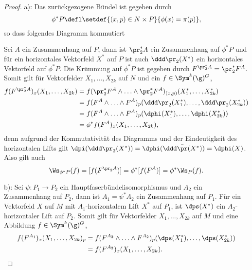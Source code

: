 \documentclass[%
	paper=a5,%
	fleqn,%
	DIV=18,%
	BCOR=0mm,
	fontsize=11pt,
	titlepage=false,%
	bibliography=totoc,
	DIV=18,%
	twoside=true,
	pdftitle=Riemannsche Geometrie,
	pdfauthor=Uwe Semmelmann,
	numbers=noendperiod]%
	{scrbook}
\begin{document}
\begin{proof}
a): 
Das zurückgezogene Bündel ist gegeben durch
\begin{align*}
\phi^*P \defl \setdef{(x,p)\in N\times P}{\phi(x) = \pi(p)},
\end{align*}
so dass folgendes Diagramm kommutiert

{

\centering


}

Sei $A$ ein Zusammenhang auf $P$, dann ist $\pr_2^*A$ ein
Zusammenhang auf $\phi^*P$ und für ein horizontales Vektorfeld $X^*$ auf $P$
ist auch $\ddd \pr_2(X^*)$ ein horizontales Vektorfeld auf $\phi^*P$. Die
Krümmung auf $\phi^*P$ ist gegeben durch $F^{\pr_2^* A} = \pr_2^*
F^A$. Somit gilt für Vektorfelder $X_1,\ldots,X_{2k}$ auf $N$ und ein
$f\in \Sym^k(\g)^G$,
\begin{align*}
f(F^{\pr_2^*A})_x(X_1,\ldots,X_{2k})
&= 
f(\pr_2^* F^A \wedge \ldots\wedge \pr_2^* F^A)_{(x,p)}(X_1^*,\ldots,X_{2k}^*)\\
&= 
f(F^A \wedge \ldots\wedge
F^A)_{p}(\ddd\pr_2(X_1^*),\ldots,\ddd\pr_2(X_{2k}^*)) \\
&= f(F^A \wedge
\ldots\wedge F^A)_{p}(\dphi(X_1^*),\ldots,\dphi(X_{2k}^*)) \\
&= \phi^*
f(F^A)_x(X_1,\ldots,X_{2k}),
\end{align*}
denn aufgrund der Kommutativität des Diagramms und der Eindeutigkeit des
horizontalen Lifts gilt $\dpi(\ddd\pr_2(X^*)) = \dphi(\ddd\bar{\pr}(X^*)) =
\dphi(X)$. Also gilt auch
\begin{align*}
\Ws_{\phi^*P}(f) = [f(F^{\pr_2 A})] = \phi^*[f(F^A)]
= \phi^* \Ws_{P}(f).
\end{align*}

b): Sei $\psi\colon P_1\to P_2$ ein Hauptfaserbündelisomorphismus und $A_2$ ein
Zusammenhang auf $P_2$, dann ist $A_1=\psi^* A_2$ ein Zusammenhang auf $P_1$.
Für ein Vektorfeld $X$ auf $M$ mit $A_1$-horizontalem Lift $X^*$ auf $P_1$, ist
$\dps(X^*)$ ein $A_2$-horizontaler Lift auf $P_2$. Somit gilt für Vektorfelder
$X_1,\ldots,X_{2k}$ auf $M$ und eine Abbildung $f\in \Sym^k(\g)^G$,
\begin{align*}
f(F^{A_1})_x(X_1,\ldots,X_{2k})_p
&= f(F^{A_2}\wedge \ldots \wedge
F^{A_2})_p(\dps(X_1^*),\ldots,\dps(X_{2k}^*))\\ 
&= f(F^{A_2})_{x}(X_1,\ldots,X_{2k}).
\end{align*}


\end{proof}
\end{document}
